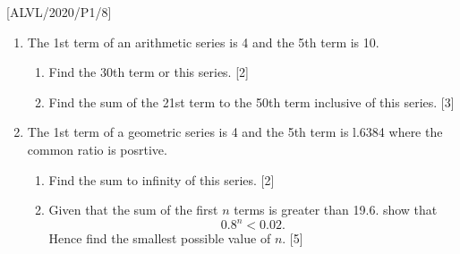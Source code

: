 \item {[}ALVL/2020/P1/8{]}
\begin{enumerate}
\item The 1st term of an arithmetic series is 4 and the 5th term is 10. 
\begin{enumerate}
\item Find the 30th term or this series. \hfill{}{[}2{]}
\item Find the sum of the 21st term to the 50th term inclusive of this series.
\hfill{}{[}3{]}
\end{enumerate}
\item The 1st term of a geometric series is 4 and the 5th term is l.6384
where the common ratio is posrtive. 
\begin{enumerate}
\item Find the sum to infinity of this series. \hfill{}{[}2{]}
\item Given that the sum of the first $n$ terms is greater than 19.6. show
that 
\[
0.8^{n}<0.02.
\]
Hence find the smallest possible value of $n$.\hfill{} {[}5{]}
\end{enumerate}
\end{enumerate}
